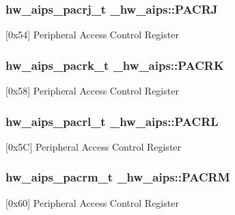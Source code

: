 \subsubsection[{\texorpdfstring{P\+A\+C\+RJ}{PACRJ}}]{ {\bf hw\+\_\+aips\+\_\+pacrj\+\_\+t} \+\_\+hw\+\_\+aips\+::\+P\+A\+C\+RJ}\hypertarget{struct__hw__aips_afad9b701f382ce9e45332f88f2743c51}{}\label{struct__hw__aips_afad9b701f382ce9e45332f88f2743c51}
\mbox{[}0x54\mbox{]} Peripheral Access Control Register 
\subsubsection[{\texorpdfstring{P\+A\+C\+RK}{PACRK}}]{ {\bf hw\+\_\+aips\+\_\+pacrk\+\_\+t} \+\_\+hw\+\_\+aips\+::\+P\+A\+C\+RK}\hypertarget{struct__hw__aips_ac944d54a564139d2117819ef6e2077b0}{}\label{struct__hw__aips_ac944d54a564139d2117819ef6e2077b0}
\mbox{[}0x58\mbox{]} Peripheral Access Control Register 
\subsubsection[{\texorpdfstring{P\+A\+C\+RL}{PACRL}}]{ {\bf hw\+\_\+aips\+\_\+pacrl\+\_\+t} \+\_\+hw\+\_\+aips\+::\+P\+A\+C\+RL}\hypertarget{struct__hw__aips_a4fcef9ce1d48239e31605340abfb6e5c}{}\label{struct__hw__aips_a4fcef9ce1d48239e31605340abfb6e5c}
\mbox{[}0x5C\mbox{]} Peripheral Access Control Register 
\subsubsection[{\texorpdfstring{P\+A\+C\+RM}{PACRM}}]{ {\bf hw\+\_\+aips\+\_\+pacrm\+\_\+t} \+\_\+hw\+\_\+aips\+::\+P\+A\+C\+RM}\hypertarget{struct__hw__aips_aa801e08962161646524a6b0c76b337eb}{}\label{struct__hw__aips_aa801e08962161646524a6b0c76b337eb}
\mbox{[}0x60\mbox{]} Peripheral Access Control Register 
